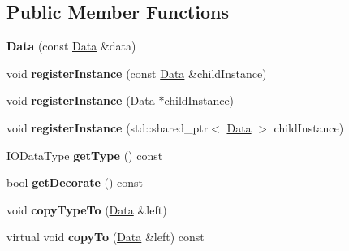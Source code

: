 \subsection*{Public Member Functions}
\begin{DoxyCompactItemize}
\item 
\mbox{\label{classfilter_1_1data_1_1_data_acc0dcf88474d97ff83aaa720206823d2}} 
{\bfseries Data} (const \hyperlink{classfilter_1_1data_1_1_data}{Data} \&data)
\item 
\mbox{\label{classfilter_1_1data_1_1_data_a53fe854b2f08c1dbb36c89507534b686}} 
void {\bfseries register\+Instance} (const \hyperlink{classfilter_1_1data_1_1_data}{Data} \&child\+Instance)
\item 
\mbox{\label{classfilter_1_1data_1_1_data_a5c520edda1a677fce2b17efea3e89f76}} 
void {\bfseries register\+Instance} (\hyperlink{classfilter_1_1data_1_1_data}{Data} $\ast$child\+Instance)
\item 
\mbox{\label{classfilter_1_1data_1_1_data_a64243539d0f374448a2e1fd211e534f0}} 
void {\bfseries register\+Instance} (std\+::shared\+\_\+ptr$<$ \hyperlink{classfilter_1_1data_1_1_data}{Data} $>$ child\+Instance)
\item 
\mbox{\label{classfilter_1_1data_1_1_data_ae7cff6f7c57c4c3f495b3e268342870e}} 
I\+O\+Data\+Type {\bfseries get\+Type} () const
\item 
\mbox{\label{classfilter_1_1data_1_1_data_a6094f1de5517d63d5ed202cadc883acc}} 
bool {\bfseries get\+Decorate} () const
\item 
\mbox{\label{classfilter_1_1data_1_1_data_a7478bba941654186dd0bf8cd7cf639fc}} 
void {\bfseries copy\+Type\+To} (\hyperlink{classfilter_1_1data_1_1_data}{Data} \&left)
\item 
\mbox{\label{classfilter_1_1data_1_1_data_aae174a103a5457c063dbcde8ad5b9338}} 
virtual void {\bfseries copy\+To} (\hyperlink{classfilter_1_1data_1_1_data}{Data} \&left) const
\item 

\end{DoxyCompactItemize}
